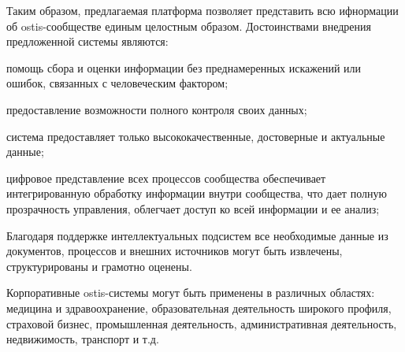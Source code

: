 Таким образом, предлагаемая платформа позволяет представить всю ифнормации об ostis-сообществе единым целостным образом. 
Достоинствами внедрения предложенной системы являются:
\begin{textitemize}
    \item помощь сбора и оценки информации без преднамеренных искажений или ошибок, связанных с человеческим фактором;
    \item предоставление возможности полного контроля своих данных;
    \item система предоставляет только высококачественные, достоверные и актуальные данные;
    \item цифровое представление всех процессов сообщества обеспечивает интегрированную обработку информации внутри сообщества, что дает полную прозрачность управления, облегчает доступ ко всей информации и ее анализ;
    \item Благодаря поддержке интеллектуальных подсистем все необходимые данные из документов, процессов и внешних источников могут быть извлечены, структурированы и грамотно оценены.
\end{textitemize}

Корпоративные ostis-системы могут быть применены в различных областях: медицина и здравоохранение, образовательная деятельность широкого профиля, страховой бизнес, промышленная деятельность, административная деятельность, недвижимость, транспорт и т.д.

